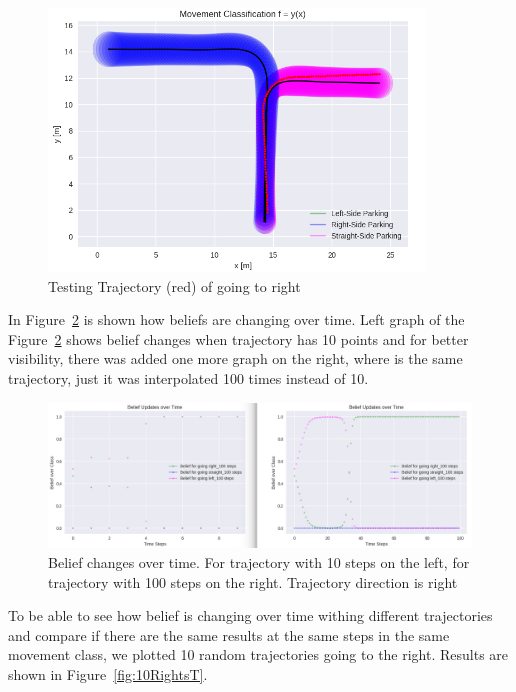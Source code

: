 \begin{figure}[H]
	\centering  	
	\includegraphics[width=10cm]{img/right_org_T.jpg}
	\caption{Testing Trajectory (red) of going to right}
	\label{fig:right_T}    
\end{figure}

In Figure~\ref{fig:CompareRightT} is shown how beliefs are changing over time. Left graph of the Figure~\ref{fig:CompareRightT} shows belief changes when trajectory has 10 points and for better visibility, there was added one more graph on the right, where is the same trajectory, just it was interpolated 100 times instead of 10.

\begin{figure}[H]
	\centering  	
	\includegraphics[width=15cm]{img/10_100_compared_right_T.jpg}
	\caption{Belief changes over time. For trajectory with 10 steps on the left, for trajectory with 100 steps on the right. Trajectory direction is right}
	\label{fig:CompareRightT}    
\end{figure}

To be able to see how belief is changing over time withing different trajectories and compare if there are the same results at the same steps in the same movement class, we plotted 10 random trajectories going to the right. Results are shown in Figure~\ref{fig:10RightsT}.

